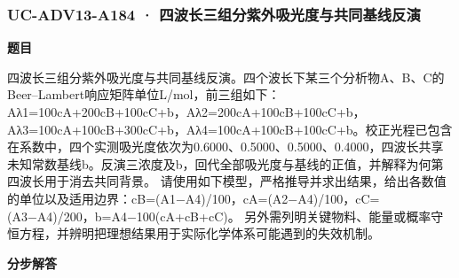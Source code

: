 \documentclass[UTF8,11pt,a4paper]{ctexart}
\begin{document}
\subsubsection*{UC-ADV13-A184 · 四波长三组分紫外吸光度与共同基线反演}
\noindent\textbf{题目}\par
四波长三组分紫外吸光度与共同基线反演。四个波长下某三个分析物A、B、C的Beer–Lambert响应矩阵单位L/mol，前三组如下：Aλ1=100cA+200cB+100cC+b，Aλ2=200cA+100cB+100cC+b，Aλ3=100cA+100cB+300cC+b，Aλ4=100cA+100cB+100cC+b。校正光程已包含在系数中，四个实测吸光度依次为0.6000、0.5000、0.5000、0.4000，四波长共享未知常数基线b。反演三浓度及b，回代全部吸光度与基线的正值，并解释为何第四波长用于消去共同背景。 请使用如下模型，严格推导并求出结果，给出各数值的单位以及适用边界：cB=(A1−A4)/100，cA=(A2−A4)/100，cC=(A3−A4)/200，b=A4−100(cA+cB+cC)。 另外需列明关键物料、能量或概率守恒方程，并辨明把理想结果用于实际化学体系可能遇到的失效机制。\par
\medskip\noindent\textbf{分步解答}
\end{document}
